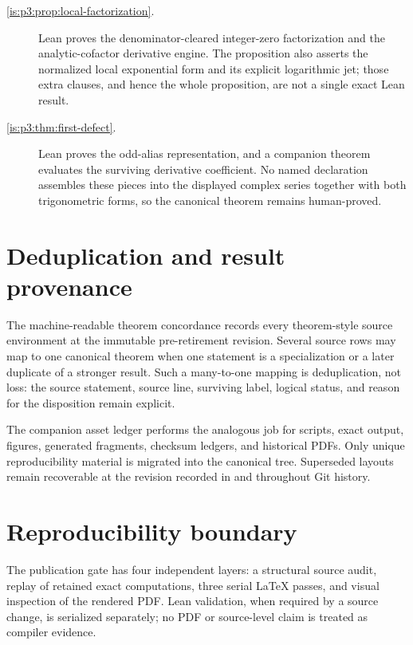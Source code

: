 \begin{description}
\item[\cref{is:p3:prop:local-factorization}.]
Lean proves the denominator-cleared integer-zero factorization and the
analytic-cofactor derivative engine.  The proposition also asserts the
normalized local exponential form and its explicit logarithmic jet; those
extra clauses, and hence the whole proposition, are not a single exact Lean
result.

\item[\cref{is:p3:thm:first-defect}.]
Lean proves the odd-alias representation, and a companion theorem evaluates
the surviving derivative coefficient.  No named declaration assembles these
pieces into the displayed complex series together with both trigonometric
forms, so the canonical theorem remains human-proved.

\end{description}

\section{Deduplication and result provenance}
\label{sec:result-provenance}

The machine-readable theorem concordance records every theorem-style source
environment at the immutable pre-retirement revision.  Several source rows may
map to one canonical theorem when one statement is a specialization or a
later duplicate of a stronger result.  Such a many-to-one mapping is
deduplication, not loss: the source statement, source line, surviving label,
logical status, and reason for the disposition remain explicit.

The companion asset ledger performs the analogous job for scripts, exact
output, figures, generated fragments, checksum ledgers, and historical PDFs.
Only unique reproducibility material is migrated into the canonical
 tree.  Superseded layouts remain recoverable at the revision
recorded in  and throughout Git history.

\section{Reproducibility boundary}
\label{sec:reproducibility-boundary}

The publication gate has four independent layers: a structural source audit,
replay of retained exact computations, three serial \LaTeX{} passes, and
visual inspection of the rendered PDF.  Lean validation, when required by a
source change, is serialized separately; no PDF or source-level claim is
treated as compiler evidence.

